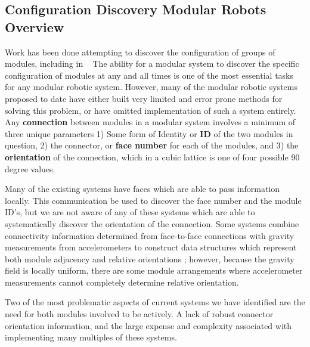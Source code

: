 \subsection{Configuration Discovery Modular Robots Overview}
\label{sec:RWconfiguration}
	
	Work has been done attempting to discover the configuration of groups of modules, including in ~\cite{park2008automatic}
	The ability for a modular system to discover the specific configuration of modules at any and all times is one of the most essential tasks for any modular robotic system. However, many of the modular robotic systems proposed to date have either built very limited and error prone methods for solving this problem, or have omitted implementation of such a system entirely. Any \textbf{connection} between modules in a modular system involves a minimum of three unique parameters 1) Some form of Identity or \textbf{ID} of the two modules in question, 2) the connector, or \textbf{face number} for each of the modules, and 3) the \textbf{orientation} of the connection, which in a cubic lattice is one of four possible 90 degree values.

	Many of the existing systems have faces which are able to pass information locally. This communication be used to discover the face number and the module ID's, but we are not aware of any of these systems which are able to systematically discover the orientation of the connection. Some systems combine connectivity information determined from face-to-face connections with gravity measurements from accelerometers to construct data structures which represent both module adjacency and relative orientations \cite{Soldercubes2016}; however, because the gravity field is locally uniform, there are some module arrangements where accelerometer measurements cannot completely determine relative orientation.

	Two of the most problematic aspects of current systems we have identified are the need for both modules involved to be actively. A lack of robust connector orientation information, and the large expense and complexity associated with implementing many multiples of these systems.



